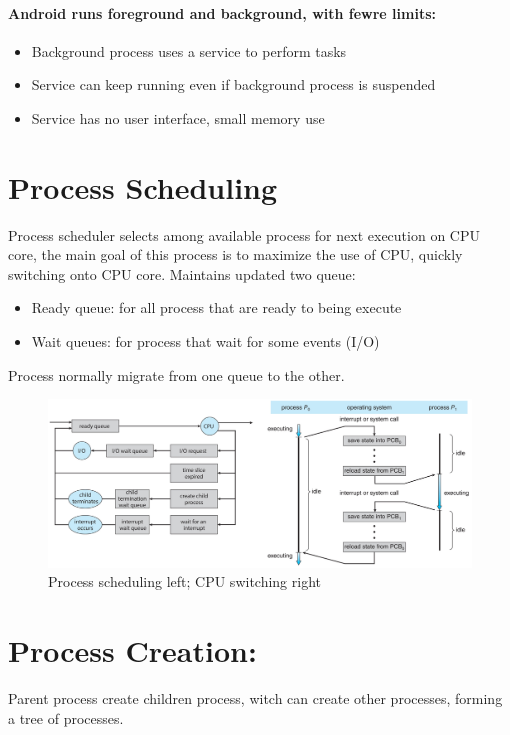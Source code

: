 \paragraph{Android runs foreground and background, with fewre limits:}

\begin{itemize}
    \item Background process uses a service to perform tasks
    \item Service can keep running even if background process is suspended
    \item Service has no user interface, small memory use
\end{itemize}


\newpage
\section{Process Scheduling}

Process scheduler selects among available process for next execution on CPU core, the main goal of this process is to maximize the use of CPU, quickly switching onto CPU core.
Maintains updated two queue:

\begin{itemize}
    \item Ready queue: for all process that are ready to being execute
    \item Wait queues: for process that wait for some events (I/O)
\end{itemize}
Process normally migrate from one queue to the other.

\begin{figure}[htbp]
    \centering
    \includegraphics[width=0.95\linewidth]{img/scheduling.png}
    \caption{Process scheduling left; CPU switching right}    
\end{figure}



\section{Process Creation: }
Parent process create children process, witch can create other processes, forming a tree of processes.

